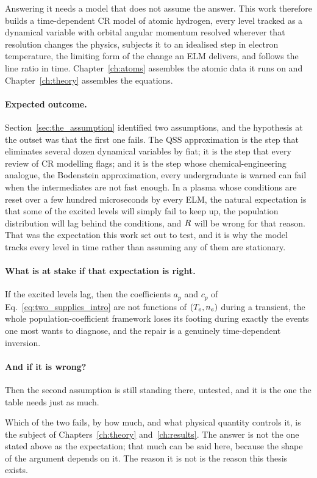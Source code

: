 Answering it needs a model that does not assume the answer. This work therefore
builds a time-dependent CR model of atomic hydrogen, every level tracked as a
dynamical variable with orbital angular momentum resolved wherever that
resolution changes the physics, subjects it to an idealised step in electron
temperature, the limiting form of the change an ELM delivers, and follows the line ratio in time.
Chapter~\ref{ch:atoms} assembles the atomic data it runs on and
Chapter~\ref{ch:theory} assembles the equations.

\paragraph{Expected outcome.} Section~\ref{sec:the_assumption} identified
two assumptions, and the hypothesis at the outset was that the first one fails. The QSS approximation
is the step that eliminates several dozen dynamical variables by fiat; it is the
step that every review of CR modelling flags; and it is the step whose
chemical-engineering analogue, the Bodenstein approximation, every
undergraduate is warned can fail when the intermediates are not fast enough. In a
plasma whose conditions are reset over a few hundred microseconds by every ELM,
the natural expectation is that some of the excited levels will simply fail to
keep up, the population distribution will lag behind the conditions, and $R$
will be wrong for that reason. That was the expectation this work set out to test, and it is why the
model tracks every level in time rather than assuming any of them are stationary.

\paragraph{What is at stake if that expectation is right.} If the excited levels
lag, then the coefficients $a_p$ and $c_p$ of Eq.~\eqref{eq:two_supplies_intro}
are not functions of $(T_e,n_e)$ during a transient, the whole
population-coefficient framework loses its footing during exactly the events one
most wants to diagnose, and the repair is a genuinely time-dependent inversion.

\paragraph{And if it is wrong?} Then the second assumption is still standing
there, untested, and it is the one the table needs just as much.

Which of the two fails, by how much, and what physical quantity controls it, is
the subject of Chapters~\ref{ch:theory} and~\ref{ch:results}. The answer is not
the one stated above as the expectation; that much can be said here, because
the shape of the argument depends on it. The reason it is not is the reason
this thesis exists.

